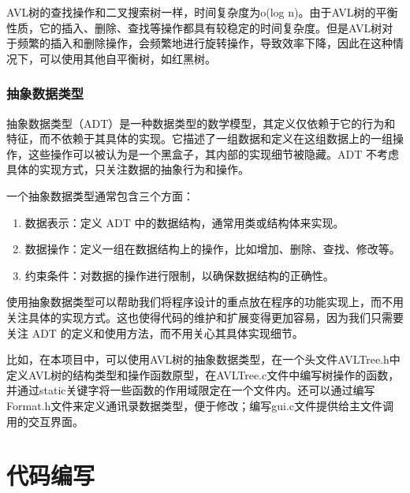 \documentclass[12pt, a4paper, oneside]{ctexart}
\begin{document}
\indent AVL树的查找操作和二叉搜索树一样，时间复杂度为o(log n)。由于AVL树的平衡性质，它的插入、删除、查找等操作都具有较稳定的时间复杂度。但是AVL树对于频繁的插入和删除操作，会频繁地进行旋转操作，导致效率下降，因此在这种情况下，可以使用其他自平衡树，如红黑树。

\subsubsection{抽象数据类型}
抽象数据类型（ADT）是一种数据类型的数学模型，其定义仅依赖于它的行为和特征，而不依赖于其具体的实现。它描述了一组数据和定义在这组数据上的一组操作，这些操作可以被认为是一个黑盒子，其内部的实现细节被隐藏。ADT 不考虑具体的实现方式，只关注数据的抽象行为和操作。

一个抽象数据类型通常包含三个方面：

\begin{enumerate}
    \item 数据表示：定义 ADT 中的数据结构，通常用类或结构体来实现。
    \item 数据操作：定义一组在数据结构上的操作，比如增加、删除、查找、修改等。
    \item 约束条件：对数据的操作进行限制，以确保数据结构的正确性。
\end{enumerate}

使用抽象数据类型可以帮助我们将程序设计的重点放在程序的功能实现上，而不用关注具体的实现方式。这也使得代码的维护和扩展变得更加容易，因为我们只需要关注 ADT 的定义和使用方法，而不用关心其具体实现细节。

比如，在本项目中，可以使用AVL树的抽象数据类型，在一个头文件AVLTree.h中定义AVL树的结构类型和操作函数原型，在AVLTree.c文件中编写树操作的函数，并通过static关键字将一些函数的作用域限定在一个文件内。还可以通过编写Format.h文件来定义通讯录数据类型，便于修改；编写gui.c文件提供给主文件调用的交互界面。

\section{代码编写}
\end{document}
